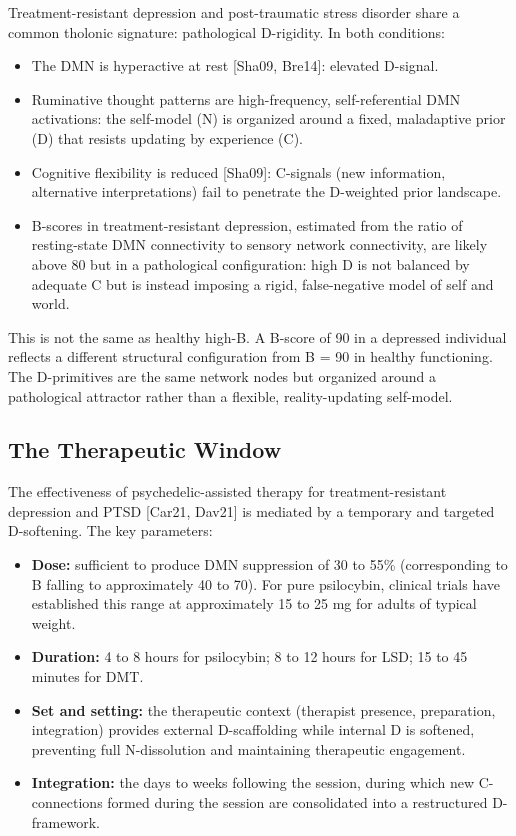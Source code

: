 \documentclass[12pt]{article}
\providecommand{\tightlist}{%
  \setlength{\itemsep}{0pt}\setlength{\parskip}{0pt}}
\begin{document}
Treatment-resistant depression and post-traumatic stress disorder share
a common tholonic signature: pathological D-rigidity. In both
conditions:

\begin{itemize}
\tightlist
\item
  The DMN is hyperactive at rest {[}Sha09, Bre14{]}: elevated D-signal.
\item
  Ruminative thought patterns are high-frequency, self-referential DMN
  activations: the self-model (N) is organized around a fixed,
  maladaptive prior (D) that resists updating by experience (C).
\item
  Cognitive flexibility is reduced {[}Sha09{]}: C-signals (new
  information, alternative interpretations) fail to penetrate the
  D-weighted prior landscape.
\item
  B-scores in treatment-resistant depression, estimated from the ratio
  of resting-state DMN connectivity to sensory network connectivity, are
  likely above 80 but in a pathological configuration: high D is not
  balanced by adequate C but is instead imposing a rigid, false-negative
  model of self and world.
\end{itemize}

This is not the same as healthy high-B. A B-score of 90 in a depressed
individual reflects a different structural configuration from B = 90 in
healthy functioning. The D-primitives are the same network nodes but
organized around a pathological attractor rather than a flexible,
reality-updating self-model.

\subsection{The Therapeutic Window}\label{the-therapeutic-window}

The effectiveness of psychedelic-assisted therapy for
treatment-resistant depression and PTSD {[}Car21, Dav21{]} is mediated
by a temporary and targeted D-softening. The key parameters:

\begin{itemize}
\tightlist
\item
  \textbf{Dose:} sufficient to produce DMN suppression of 30 to 55\%
  (corresponding to B falling to approximately 40 to 70). For pure
  psilocybin, clinical trials have established this range at
  approximately 15 to 25 mg for adults of typical weight.
\item
  \textbf{Duration:} 4 to 8 hours for psilocybin; 8 to 12 hours for LSD;
  15 to 45 minutes for DMT.
\item
  \textbf{Set and setting:} the therapeutic context (therapist presence,
  preparation, integration) provides external D-scaffolding while
  internal D is softened, preventing full N-dissolution and maintaining
  therapeutic engagement.
\item
  \textbf{Integration:} the days to weeks following the session, during
  which new C-connections formed during the session are consolidated
  into a restructured D-framework.
\end{itemize}
\end{document}
